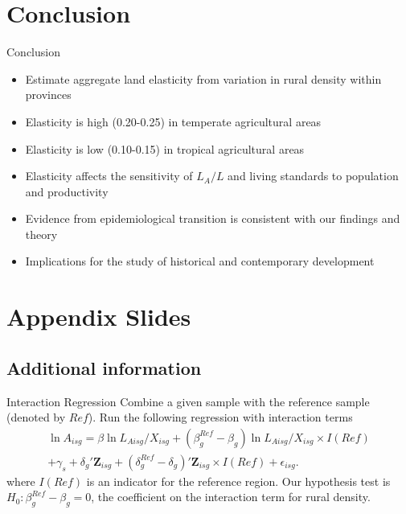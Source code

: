 \documentclass[10pt, xcolor=dvipsnames]{beamer}
\begin{document}
\section{Conclusion}

\begin{frame}{Conclusion}
\begin{itemize}
  \item Estimate aggregate land elasticity from variation in rural density within provinces
  \item Elasticity is high (0.20-0.25) in temperate agricultural areas 
  \item Elasticity is low (0.10-0.15) in tropical agricultural areas 
  \item Elasticity affects the sensitivity of $L_A/L$ and living standards to population and productivity
  \item Evidence from epidemiological transition is consistent with our findings and theory
  \item Implications for the study of historical and contemporary development
\end{itemize}
\end{frame}

\section{Appendix Slides}
\appendix

\subsection{Additional information}
\begin{frame}{Interaction Regression}\label{interaction}
Combine a given sample with the reference sample (denoted by $Ref$). Run the following regression with interaction terms
\begin{eqnarray}
    \ln A_{isg} = \beta \ln L_{Aisg}/X_{isg} + (\beta^{Ref}_g - \beta_g) \ln L_{Aisg}/X_{isg} \times I(Ref) \\ \nonumber
    + \gamma_{s} + \delta_g' \mathbf{Z}_{isg} + (\delta^{Ref}_g - \delta_g)'\mathbf{Z}_{isg} \times I(Ref) + \epsilon_{isg}. \label{EQ_interaction}
\end{eqnarray}
where $I(Ref)$ is an indicator for the reference region. Our hypothesis test is $H_0: \beta^{Ref}_g - \beta_g = 0$, the coefficient on the interaction term for rural density. 

\hfill \hyperlink{testing}{}
\end{frame}
\end{document}

